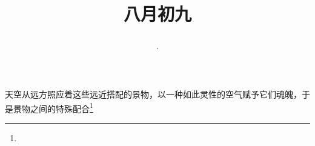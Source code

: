 \title{\date[d=11,m=9,y=2024][year:cn-y,年,month:cn,day:cn,日,·,weekday]·八月初九 }
天空从远方照应着这些远近搭配的景物，以一种如此灵性的空气赋予它们魂魄，于是景物之间的特殊配合\footnote{ }

